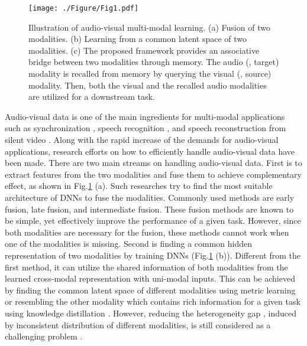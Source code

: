 \documentclass[10pt,twocolumn,letterpaper]{article}
\begin{document}
\begin{figure}[t]
	\begin{minipage}[b]{1.0\linewidth}
		\centering
		\centerline{\texttt{[image: ./Figure/Fig1.pdf]}}
	\end{minipage}
	\vspace{-0.4cm}
	\caption{Illustration of audio-visual multi-modal learning. (a) Fusion of two modalities.
	(b) Learning from a common latent space of two modalities.
	(c) The proposed framework provides an associative bridge between two modalities through memory. The audio (\ie, target) modality is recalled from memory by querying the visual (\ie, source) modality. Then, both the visual and the recalled audio modalities are utilized for a downstream task.}
	\label{fig:1}
	\vspace{-0.6cm}
\end{figure}


Audio-visual data is one of the main ingredients for multi-modal applications such as synchronization \cite{Chung16sync,chung2019perfect}, speech recognition \cite{afouras2018deep, petridis2018end}, and speech reconstruction from silent video \cite{l2w,akbari2018lip2audspec}. Along with the rapid increase of the demands for audio-visual applications, research efforts on how to efficiently handle audio-visual data have been made. There are two main streams on handling audio-visual data. First is to extract features from the two modalities and fuse them to achieve complementary effect, as shown in Fig.\ref{fig:1} (a). Such researches \cite{petridis2018end, afouras2018deep, noda2015avsr3} try to find the most suitable architecture of DNNs to fuse the modalities. Commonly used methods are early fusion, late fusion, and intermediate fusion. These fusion methods are known to be simple, yet effectively improve the performance of a given task. However, since both modalities are necessary for the fusion, these methods cannot work when one of the modalities is missing. Second is finding a common hidden representation of two modalities by training DNNs (Fig.\ref{fig:1} (b)). Different from the first method, it can utilize the shared information of both modalities from the learned cross-modal representation with uni-modal inputs. This can be achieved by finding the common latent space of different modalities using metric learning \cite{Chung16sync,chung2019perfect} or resembling the other modality which contains rich information for a given task using knowledge distillation \cite{zhao2020hearing}. However, reducing the heterogeneity gap \cite{huang2018crossmedia}, induced by inconsistent distribution of different modalities, is still considered as a challenging problem \cite{hu2019sdml,peng2019cmgan}.
\end{document}
